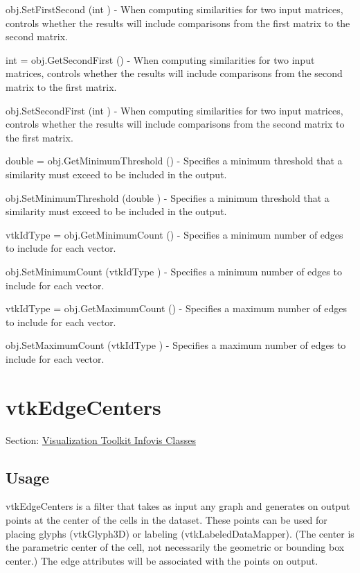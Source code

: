 \begin{DoxyItemize}
\item {\ttfamily obj.\-Set\-First\-Second (int )} -\/ When computing similarities for two input matrices, controls whether the results will include comparisons from the first matrix to the second matrix.  
\item {\ttfamily int = obj.\-Get\-Second\-First ()} -\/ When computing similarities for two input matrices, controls whether the results will include comparisons from the second matrix to the first matrix.  
\item {\ttfamily obj.\-Set\-Second\-First (int )} -\/ When computing similarities for two input matrices, controls whether the results will include comparisons from the second matrix to the first matrix.  
\item {\ttfamily double = obj.\-Get\-Minimum\-Threshold ()} -\/ Specifies a minimum threshold that a similarity must exceed to be included in the output.  
\item {\ttfamily obj.\-Set\-Minimum\-Threshold (double )} -\/ Specifies a minimum threshold that a similarity must exceed to be included in the output.  
\item {\ttfamily vtk\-Id\-Type = obj.\-Get\-Minimum\-Count ()} -\/ Specifies a minimum number of edges to include for each vector.  
\item {\ttfamily obj.\-Set\-Minimum\-Count (vtk\-Id\-Type )} -\/ Specifies a minimum number of edges to include for each vector.  
\item {\ttfamily vtk\-Id\-Type = obj.\-Get\-Maximum\-Count ()} -\/ Specifies a maximum number of edges to include for each vector.  
\item {\ttfamily obj.\-Set\-Maximum\-Count (vtk\-Id\-Type )} -\/ Specifies a maximum number of edges to include for each vector.  
\end{DoxyItemize}\hypertarget{vtkinfovis_vtkedgecenters}{}\section{vtk\-Edge\-Centers}\label{vtkinfovis_vtkedgecenters}
Section\-: \hyperlink{sec_vtkinfovis}{Visualization Toolkit Infovis Classes} \hypertarget{vtkwidgets_vtkxyplotwidget_Usage}{}\subsection{Usage}\label{vtkwidgets_vtkxyplotwidget_Usage}
vtk\-Edge\-Centers is a filter that takes as input any graph and generates on output points at the center of the cells in the dataset. These points can be used for placing glyphs (vtk\-Glyph3\-D) or labeling (vtk\-Labeled\-Data\-Mapper). (The center is the parametric center of the cell, not necessarily the geometric or bounding box center.) The edge attributes will be associated with the points on output.

